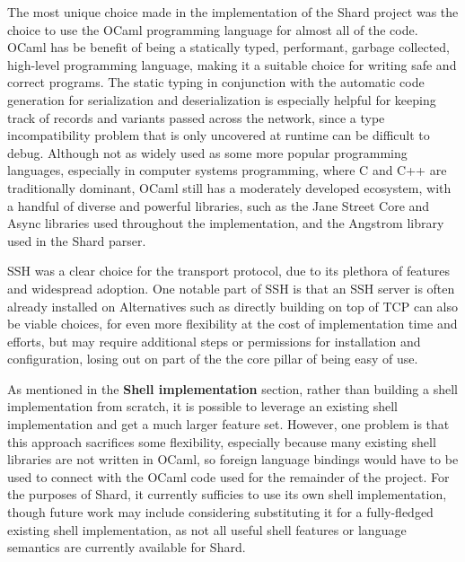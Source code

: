 \documentclass[twoside]{report}
\newcommand{\todoi}[1]{\todo[inline, color=blue!20]{TODO: {#1}}}
\begin{document}
The most unique choice made in the implementation of the Shard project was the choice to use the OCaml programming language for almost all of the code.
OCaml has be benefit of being a statically typed, performant, garbage collected, high-level programming language, making it a suitable choice for writing safe and correct programs.
The static typing in conjunction with the automatic code generation for serialization and deserialization is especially helpful for keeping track of records and variants passed across the network, since a type incompatibility problem that is only uncovered at runtime can be difficult to debug.
Although not as widely used as some more popular programming languages, especially in computer systems programming, where C and C++ are traditionally dominant, OCaml still has a moderately developed ecosystem, with a handful of diverse and powerful libraries, such as the Jane Street Core and Async libraries used throughout the implementation, and the Angstrom library used in the Shard parser.

SSH was a clear choice for the transport protocol, due to its plethora of features and widespread adoption.
One notable part of SSH is that an SSH server is often already installed on
Alternatives such as directly building on top of TCP can also be viable choices, for even more flexibility at the cost of implementation time and efforts, but may require additional steps or permissions for installation and configuration, losing out on part of the the core pillar of being easy of use.

As mentioned in the \textbf{Shell implementation} section, rather than building a shell implementation from scratch, it is possible to leverage an existing shell implementation and get a much larger feature set.
However, one problem is that this approach sacrifices some flexibility, especially because many existing shell libraries are not written in OCaml, so foreign language bindings would have to be used to connect with the OCaml code used for the remainder of the project.
For the purposes of Shard, it currently sufficies to use its own shell implementation, though future work may include considering substituting it for a fully-fledged existing shell implementation, as not all useful shell features or language semantics are currently available for Shard.
\todoi{Cite examples of existing shells as libraries}
\end{document}
